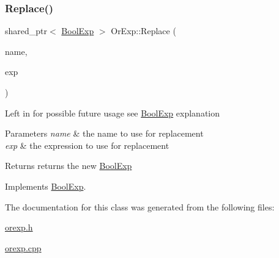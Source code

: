 \subsubsection{\texorpdfstring{Replace()}{Replace()}}
{\footnotesize\ttfamily shared\+\_\+ptr$<$ \mbox{\hyperlink{classBoolExp}{Bool\+Exp}} $>$ Or\+Exp\+::\+Replace (\begin{DoxyParamCaption}\item[{string}]{name,  }\item[{\mbox{\hyperlink{classBoolExp}{Bool\+Exp}} \&}]{exp }\end{DoxyParamCaption})\hspace{0.3cm}{\ttfamily [virtual]}}

Left in for possible future usage see \mbox{\hyperlink{classBoolExp}{Bool\+Exp}} explanation 
\begin{DoxyParams}{Parameters}
{\em name} & the name to use for replacement \\
\hline
{\em exp} & the expression to use for replacement \\
\hline
\end{DoxyParams}
\begin{DoxyReturn}{Returns}
returns the new \mbox{\hyperlink{classBoolExp}{Bool\+Exp}} 
\end{DoxyReturn}


Implements \mbox{\hyperlink{classBoolExp_a6448b7121c238759cc9cc8e48d6f8773}{Bool\+Exp}}.



The documentation for this class was generated from the following files\+:\begin{DoxyCompactItemize}
\item 
\mbox{\hyperlink{orexp_8h}{orexp.\+h}}\item 
\mbox{\hyperlink{orexp_8cpp}{orexp.\+cpp}}\end{DoxyCompactItemize}

